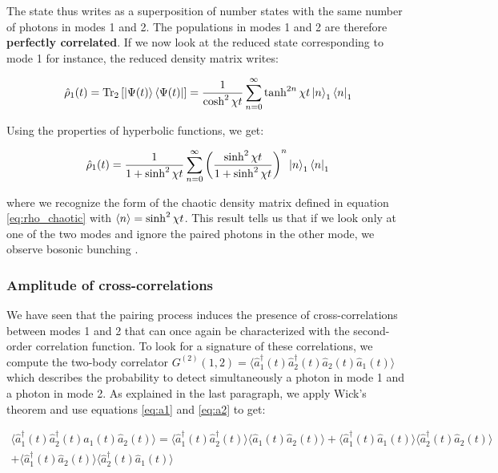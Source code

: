 \noindent The state thus writes as a superposition of number states with the same number of photons in modes 1 and 2. The populations in modes 1 and 2 are therefore \textbf{perfectly correlated}. If we now look at the reduced state corresponding to mode 1 for instance, the reduced density matrix writes:

\begin{equation}
    \hat{\rho}_1 (t) = \mathrm{Tr}_2 \left[ \ket{\Psi(t)} \bra{\Psi(t)} \right] = \frac{1}{\cosh^2 \chi t} \sum_{n=0}^{\infty}\tanh^{2n} \chi t \ket{n}_1 \bra{n}_1
\end{equation}

\noindent Using the properties of hyperbolic functions, we get:

\begin{equation}
 \hat{\rho}_1 (t) = \frac{1}{1+ \sinh^2 \chi t} \sum_{n=0}^{\infty} \left( \frac{\sinh^2 \chi t}{1+\sinh^2 \chi t} \right)^n \ket{n}_1 \bra{n}_1
\end{equation}

\noindent where we recognize the form of the chaotic density matrix defined in equation \ref{eq:rho_chaotic} with $\langle n\rangle = \sinh^2 \chi t$. This result tells us that if we look only at one of the two modes and ignore the paired photons in the other mode, we observe bosonic bunching \cite{yurke1987}.


\subsubsection{Amplitude of cross-correlations}

We have seen that the pairing process induces the presence of cross-correlations between modes 1 and 2 that can once again be characterized with the second-order correlation function. To look for a signature of these correlations, we compute the two-body correlator $G^{(2)}(1,2) =\langle \hat{a}_1^{\dagger}(t) \hat{a}_2^{\dagger}(t) \hat{a}_2(t) \hat{a}_1(t) \rangle$ which describes the probability to detect simultaneously a photon in mode 1 and a photon in mode 2. As explained in the last paragraph, we apply Wick's theorem and use equations \ref{eq:a1} and \ref{eq:a2} to get:

\begin{equation}
\begin{split}
    \langle \hat{a}_1^{\dagger}(t) \hat{a}_2^{\dagger}(t) \hat{a}_1(t) \hat{a}_2(t) \rangle = \langle \hat{a}_1^{\dagger}(t) \hat{a}_2^{\dagger}(t) \rangle \langle \hat{a}_1(t) \hat{a}_2(t) \rangle +  \langle \hat{a}_1^{\dagger}(t) \hat{a}_1(t) \rangle \langle \hat{a}_2^{\dagger}(t) \hat{a}_2(t) \rangle \\
    +  \langle \hat{a}_1^{\dagger}(t) \hat{a}_2(t) \rangle \langle \hat{a}_2^{\dagger}(t) \hat{a}_1(t) \rangle
\end{split}
\end{equation}

